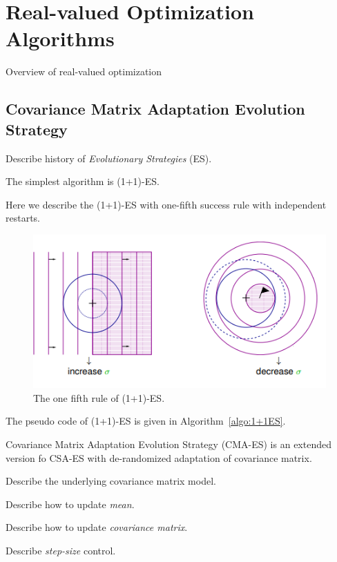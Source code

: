 \chapter{Real-valued Optimization Algorithms}
\label{chapter:algos}

Overview of real-valued optimization

\section{Covariance Matrix Adaptation Evolution Strategy}

Describe history of \textit{Evolutionary Strategies} (ES).

The simplest algorithm is (1+1)-ES.

Here we describe the (1+1)-ES with one-fifth success rule with independent restarts.

\begin{figure}
\centering
\includegraphics[width=\textwidth]{one_plus_one_ES}
\caption{The one fifth rule of (1+1)-ES.}\label{fig:one_plus_one_ES}
\end{figure}

The pseudo code of (1+1)-ES is given in Algorithm~\ref{algo:1+1ES}.

Covariance Matrix Adaptation Evolution Strategy (CMA-ES) is an extended version fo CSA-ES with de-randomized adaptation of covariance matrix.

Describe the underlying covariance matrix model.

Describe how to update \textit{mean}.

Describe how to update \textit{covariance matrix}.

Describe \textit{step-size} control.

